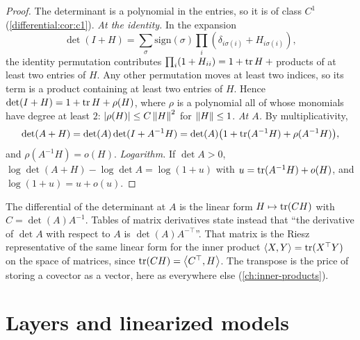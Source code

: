 \begin{notechapter}
\begin{proof}
The determinant is a polynomial in the entries, so it is of class $C^1$
(\cref{differential:cor:c1}). \emph{At the identity.} In the expansion
\[
  \det(I + H)
  = \sum_\sigma\mathrm{sign}(\sigma)\prod_i(\delta_{i\sigma(i)}
    + H_{i\sigma(i)}) ,
\]
the identity permutation contributes
$\prod_i(1 + H_{ii}) = 1 + \operatorname{tr} H + {}$products of at least two entries of
$H$. Any other permutation moves at least two indices, so its term is a
product containing at least two entries of $H$. Hence
$\det(I + H) = 1 + \operatorname{tr} H + \rho(H)$, where $\rho$ is a polynomial all of
whose monomials have degree at least $2$: $\left|\rho(H)\right|\leq C\left\|H\right\|^2$
for $\left\|H\right\|\leq1$. \emph{At $A$.} By multiplicativity,
\[
  \det(A + H) = \det(A)\det(I + A^{-1}H)
  = \det(A)\bigl(1 + \operatorname{tr}(A^{-1}H) + \rho(A^{-1}H)\bigr) ,
\]
and $\rho(A^{-1}H) = o(H)$. \emph{Logarithm.} If $\det A > 0$,
$\log\det(A + H) - \log\det A = \log(1 + u)$ with
$u = \operatorname{tr}(A^{-1}H) + o(H)$, and $\log(1 + u) = u + o(u)$.
\end{proof}

\begin{remark}
\label{differential:rem:frobenius}
The differential of the determinant at $A$ is the linear form
$H\mapsto\operatorname{tr}(CH)$ with $C = \det(A)A^{-1}$. Tables of matrix derivatives
state instead that ``the derivative of $\det A$ with respect to $A$ is
$\det(A)A^{-\top}$''. That matrix is the Riesz representative of the same
linear form for the inner product $\left\langle X, Y \right\rangle = \operatorname{tr}(X^\top Y)$ on the space
of matrices, since $\operatorname{tr}(CH) = \left\langle C^\top, H \right\rangle$. The transpose is the price
of storing a covector as a vector, here as everywhere else
(\cref{ch:inner-products}).
\end{remark}

\section{Layers and linearized models}\label{differential:sec:ml}


\end{notechapter}
